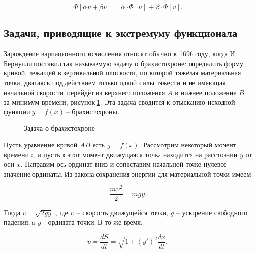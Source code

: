 \documentclass{article}
\begin{document}
\begin{displaymath}
    \Phi[\alpha u + \beta v] = \alpha \cdot \Phi[u] + \beta \cdot \Phi[v].
\end{displaymath}


\subsection{Задачи, приводящие к экстремуму функционала}

Зарождение вариационного исчисления относят обычно к 1696 году, когда И. Бернулли поставил так называемую задачу о брахистохроне: определить форму кривой, лежащей в вертикальной плоскости, по которой тяжёлая материальная точка, двигаясь под действием только одной силы тяжести и не имеющая начальной скорости, перейдёт из верхнего положения $A$ в нижнее положение $B$ за минимум времени, рисунок \ref{img_brachistochrone}. Эта задача сводится к отысканию исходной функции $y = f(x)$ – брахистохроны.

\begin{figure}[h!]
\caption{Задача о брахистохроне}
\label{img_brachistochrone}
\end{figure}

Пусть уравнение кривой $AB$ есть $y = f(x)$. Рассмотрим некоторый момент времени $t$, и пусть в этот момент движущаяся точка находится на расстоянии $y$ от оси $x$. Направим ось ординат вниз и сопоставим начальной точке нулевое значение ординаты. Из закона сохранения энергии для материальной точки имеем

\begin{displaymath}
    \frac{m\upsilon^2}{2} = mgy.
\end{displaymath}

Тогда $\upsilon = \sqrt{2gy}$ , где $\upsilon$ – скорость движущейся точки, $g$ – ускорение свободного падения, a $y$ - ордината точки. В то же время:

\begin{displaymath}
    \upsilon = \frac{dS}{dt} = \sqrt{1 + (y')^2} \frac{dx}{dt},
\end{displaymath}
\end{document}
